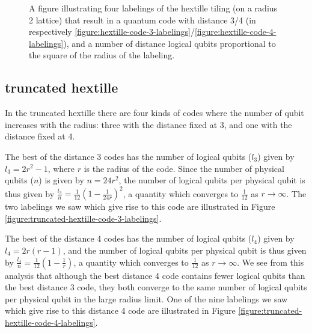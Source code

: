 \documentclass[12pt]{amsbook}
\theoremstyle{plain}
\theoremstyle{definition}
\theoremstyle{remark}
\newcommand{\paren}[1]{\left(#1\right)}
\begin{document}
\begin{figure}
{}
\caption{
\label{figure:hextille-code-labelings}
A figure illustrating four labelings of the hextille tiling (on a radius 2 lattice) that result in a quantum code with distance 3/4 (in respectively \ref{figure:hextille-code-3-labelings}/\ref{figure:hextille-code-4-labelings}), and a number of distance logical qubits proportional to the square of the radius of the labeling.
}
\end{figure}
\subsection{truncated hextille}

In the truncated hextille there are four kinds of codes where the number of qubit increases with the radius:  three with the distance fixed at 3, and one with the distance fixed at 4.

The best of the distance 3 codes has the number of logical qubits ($l_3$) given by $l_3=2r^2-1$, where $r$ is the radius of the code.  Since the number of physical qubits ($n$) is given by $n=24r^2$, the number of logical qubits per physical qubit is thus given by $\frac{l_3}{n}=\frac{1}{12}\paren{1-\frac{1}{24r}}^2$, a quantity which converges to $\frac{1}{12}$ as $r\to\infty$.  The two labelings we saw which give rise to this code are illustrated in Figure \ref{figure:truncated-hextille-code-3-labelings}.

The best of the distance 4 codes has the number of logical qubits ($l_4$) given by $l_4=2r(r-1)$, and the number of logical qubits per physical qubit is thus given by $\frac{l_4}{n}=\frac{1}{12}\paren{1-\frac{1}{r}}$, a quantity which converges to $\frac{1}{12}$ as $r\to\infty$.  We see from this analysis that although the best distance 4 code contains fewer logical qubits than the best distance 3 code, they both converge to the same number of logical qubits per physical qubit in the large radius limit.  One of the nine labelings we saw which give rise to this distance 4 code are illustrated in Figure \ref{figure:truncated-hextille-code-4-labelings}.
\end{document}
